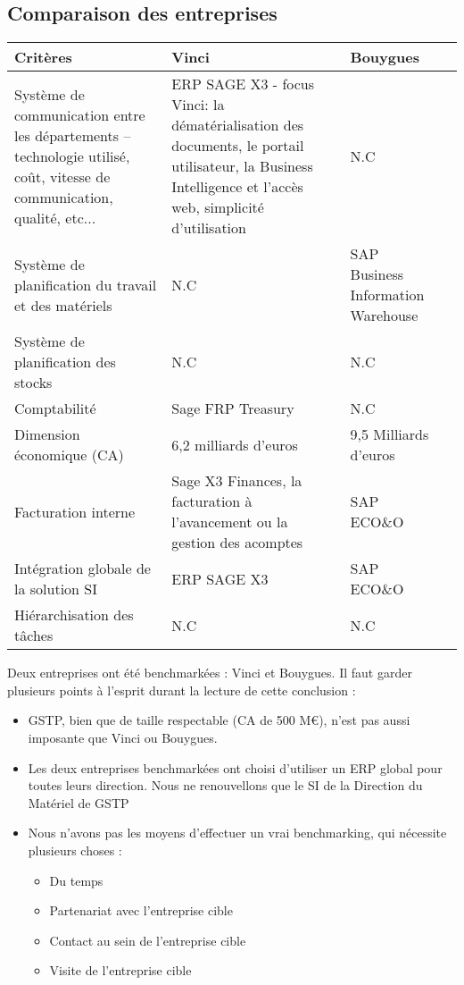 \subsection{Comparaison des entreprises}

\begin{longtable}{|m{3cm}|m{4cm}|m{4cm}|m{4cm}|}
\hline
Critères&
Vinci&Bouygues\\
\endhead
\hline
Système de communication entre les départements – technologie utilisé, 
coût, vitesse de communication, qualité, etc...
&
ERP SAGE X3 - focus Vinci: la dématérialisation des documents,
le portail utilisateur, la Business Intelligence et l’accès web,
simplicité d’utilisation
&
N.C
\\
\hline
Système de planification du travail et des matériels 
&
N.C
&
SAP Business Information Warehouse
\\
\hline
Système de planification des stocks
&
N.C
&
N.C
\\
\hline
Comptabilité
&
Sage FRP Treasury
&
N.C
\\
\hline
Dimension économique (CA)
&
6,2 milliards d’euros
&
9,5 Milliards d'euros
\\
\hline
Facturation interne
&
Sage X3 Finances, la facturation à l’avancement ou la gestion des acomptes
&
SAP ECO\&O
\\
\hline
Intégration globale de la solution SI
&
ERP SAGE X3
&
SAP ECO\&O
\\
\hline
Hiérarchisation des tâches
&
N.C
&
N.C
\\\hline
\end{longtable}

Deux entreprises ont été benchmarkées : Vinci et Bouygues. Il faut garder
plusieurs points à l'esprit durant la lecture de cette conclusion :

\begin{itemize}
\item GSTP, bien que de taille respectable (CA de 500 M\euro), n'est pas aussi
imposante que Vinci ou Bouygues.
\item Les deux entreprises benchmarkées ont choisi d'utiliser un ERP
global pour toutes leurs direction. Nous ne renouvellons que le SI de la
Direction du Matériel de GSTP
\item Nous n'avons pas les moyens d'effectuer un vrai benchmarking, qui
nécessite plusieurs choses :
    \begin{itemize}
    \item Du temps
    \item Partenariat avec l'entreprise cible
    \item Contact au sein de l'entreprise cible
    \item Visite de l'entreprise cible
    \end{itemize}
\end{itemize}

\vfill
